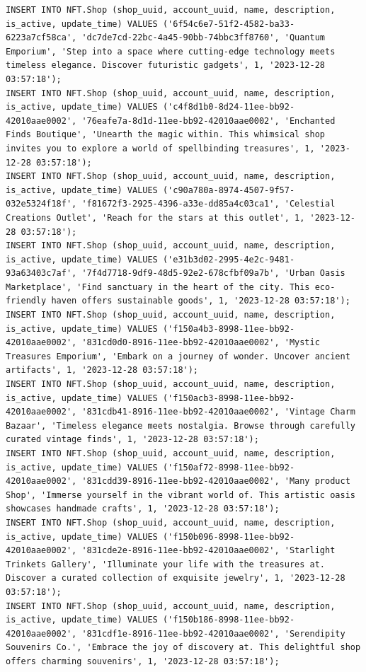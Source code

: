 \documentclass[a4paper, 12pt]{article}
\begin{document}
\begin{lstlisting}
INSERT INTO NFT.Shop (shop_uuid, account_uuid, name, description, is_active, update_time) VALUES ('6f54c6e7-51f2-4582-ba33-6223a7cf58ca', 'dc7de7cd-22bc-4a45-90bb-74bbc3ff8760', 'Quantum Emporium', 'Step into a space where cutting-edge technology meets timeless elegance. Discover futuristic gadgets', 1, '2023-12-28 03:57:18');
INSERT INTO NFT.Shop (shop_uuid, account_uuid, name, description, is_active, update_time) VALUES ('c4f8d1b0-8d24-11ee-bb92-42010aae0002', '76eafe7a-8d1d-11ee-bb92-42010aae0002', 'Enchanted Finds Boutique', 'Unearth the magic within. This whimsical shop invites you to explore a world of spellbinding treasures', 1, '2023-12-28 03:57:18');
INSERT INTO NFT.Shop (shop_uuid, account_uuid, name, description, is_active, update_time) VALUES ('c90a780a-8974-4507-9f57-032e5324f18f', 'f81672f3-2925-4396-a33e-dd85a4c03ca1', 'Celestial Creations Outlet', 'Reach for the stars at this outlet', 1, '2023-12-28 03:57:18');
INSERT INTO NFT.Shop (shop_uuid, account_uuid, name, description, is_active, update_time) VALUES ('e31b3d02-2995-4e2c-9481-93a63403c7af', '7f4d7718-9df9-48d5-92e2-678cfbf09a7b', 'Urban Oasis Marketplace', 'Find sanctuary in the heart of the city. This eco-friendly haven offers sustainable goods', 1, '2023-12-28 03:57:18');
INSERT INTO NFT.Shop (shop_uuid, account_uuid, name, description, is_active, update_time) VALUES ('f150a4b3-8998-11ee-bb92-42010aae0002', '831cd0d0-8916-11ee-bb92-42010aae0002', 'Mystic Treasures Emporium', 'Embark on a journey of wonder. Uncover ancient artifacts', 1, '2023-12-28 03:57:18');
INSERT INTO NFT.Shop (shop_uuid, account_uuid, name, description, is_active, update_time) VALUES ('f150acb3-8998-11ee-bb92-42010aae0002', '831cdb41-8916-11ee-bb92-42010aae0002', 'Vintage Charm Bazaar', 'Timeless elegance meets nostalgia. Browse through carefully curated vintage finds', 1, '2023-12-28 03:57:18');
INSERT INTO NFT.Shop (shop_uuid, account_uuid, name, description, is_active, update_time) VALUES ('f150af72-8998-11ee-bb92-42010aae0002', '831cdd39-8916-11ee-bb92-42010aae0002', 'Many product Shop', 'Immerse yourself in the vibrant world of. This artistic oasis showcases handmade crafts', 1, '2023-12-28 03:57:18');
INSERT INTO NFT.Shop (shop_uuid, account_uuid, name, description, is_active, update_time) VALUES ('f150b096-8998-11ee-bb92-42010aae0002', '831cde2e-8916-11ee-bb92-42010aae0002', 'Starlight Trinkets Gallery', 'Illuminate your life with the treasures at. Discover a curated collection of exquisite jewelry', 1, '2023-12-28 03:57:18');
INSERT INTO NFT.Shop (shop_uuid, account_uuid, name, description, is_active, update_time) VALUES ('f150b186-8998-11ee-bb92-42010aae0002', '831cdf1e-8916-11ee-bb92-42010aae0002', 'Serendipity Souvenirs Co.', 'Embrace the joy of discovery at. This delightful shop offers charming souvenirs', 1, '2023-12-28 03:57:18');

\end{lstlisting}
\end{document}

